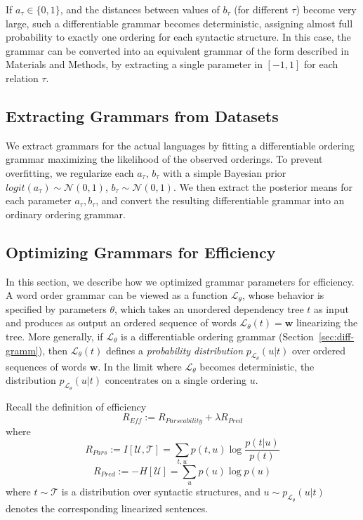 \documentclass[10pt,twoside,lineno]{article}
\begin{document}
If $a_\tau \in \{0, 1\}$, and the distances between values of $b_\tau$ (for different $\tau$) become very large, such a differentiable grammar becomes deterministic, assigning almost full probability to exactly one ordering for each syntactic structure.
In this case, the grammar can be converted into an equivalent grammar of the form described in Materials and Methods, by extracting a single parameter in $[-1, 1]$ for each relation $\tau$.


\subsection{Extracting Grammars from Datasets}
We extract grammars for the actual languages by fitting a differentiable ordering grammar maximizing the likelihood of the observed orderings.
To prevent overfitting, we regularize each $a_\tau$, $b_\tau$ with a simple Bayesian prior $logit(a_\tau) \sim \mathcal{N}(0,1)$, $b_\tau \sim \mathcal{N}(0,1)$.
We then extract the posterior means for each parameter $a_\tau, b_\tau$, and convert the resulting differentiable grammar into an ordinary ordering grammar.


\subsection{Optimizing Grammars for Efficiency}\label{sec:optim-eff}

In this section, we describe how we optimized grammar parameters for efficiency.
A word order grammar can be viewed as a function $\mathcal{L}_\theta$, whose behavior is specified by parameters $\theta$, which takes an unordered dependency tree $t$ as input and produces as output an ordered sequence of words $\mathcal{L}_\theta(t) = \mathbf{w}$ linearizing the tree.
More generally, if $\mathcal{L}_\theta$ is a differentiable ordering grammar (Section~\ref{sec:diff-gramm}), then $\mathcal{L}_\theta(t)$ defines a \emph{probability distribution} $p_{\mathcal{L}_\theta}(u|t)$ over ordered sequences of words $\mathbf{w}$.
In the limit where $\mathcal{L}_\theta$ becomes deterministic, the distribution $p_{\mathcal{L}_\theta}(u|t)$ concentrates on a single ordering $u$.

Recall the definition of efficiency
\begin{equation}\label{eq:efficiency}
	R_{\textit{Eff}} := R_{\textit{Parseability}} + \lambda R_\textit{Pred}
\end{equation}
where 
\begin{equation}
	R_{Pars} := I[\mathcal{U},\mathcal{T}] = \sum_{t,u} p(t,u) \log \frac{p(t|u)}{p(t)} 
\end{equation}
\begin{equation}
	R_{Pred} := - H[\mathcal{U}] = \sum_{u} p(u) \log p(u)
\end{equation}
where $t \sim \mathcal{T}$ is a distribution over syntactic structures, and $u \sim p_{\mathcal{L}_\theta}(u|t)$ denotes the corresponding linearized sentences.
\end{document}
